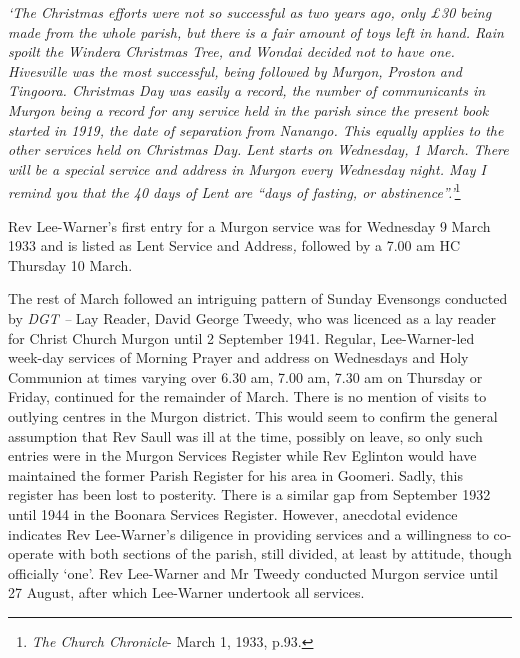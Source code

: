 \emph{`The Christmas efforts were not so successful as two years ago, only \pounds30 being made from the whole parish, but there is a fair amount of toys left in hand. Rain spoilt the Windera Christmas Tree, and Wondai decided not to have one. Hivesville was the most successful, being followed by Murgon, Proston and Tingoora. Christmas Day was easily a record, the number of communicants in Murgon being a record for any service held in the parish since the present book started in 1919, the date of separation from Nanango. This equally applies to the other services held on Christmas Day. Lent starts on Wednesday, 1 March. There will be a special service and address in Murgon every Wednesday night. May I remind you that the 40 days of Lent are ``days of fasting, or abstinence''.'}\footnote{\emph{The Church Chronicle}- March 1, 1933, p.93.}


\medskip


Rev Lee-Warner's first entry for a Murgon service was for Wednesday 9 March 1933 and is listed as Lent Service and Address\emph{,} followed by a 7.00 am HC Thursday 10 March.



The rest of March followed an intriguing pattern of Sunday Evensongs conducted by \emph{DGT --} Lay Reader, David George Tweedy, who was licenced as a lay reader for Christ Church Murgon until 2 September 1941. Regular, Lee-Warner-led week-day services of Morning Prayer and address on Wednesdays and Holy Communion at times varying over 6.30 am, 7.00 am, 7.30 am on Thursday or Friday, continued for the remainder of March. There is no mention of visits to outlying centres in the Murgon district. This would seem to confirm the general assumption that Rev Saull was ill at the time, possibly on leave, so only such entries were in the Murgon Services Register while Rev Eglinton would have maintained the former Parish Register for his area in Goomeri. Sadly, this register has been lost to posterity. There is a similar gap from September 1932 until 1944 in the Boonara Services Register. However, anecdotal evidence indicates Rev Lee-Warner's diligence in providing services and a willingness to co-operate with both sections of the parish, still divided, at least by attitude, though officially `one'. Rev Lee-Warner and Mr Tweedy conducted Murgon service until 27 August, after which Lee-Warner undertook all services.




